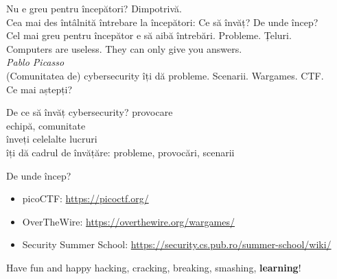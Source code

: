 \documentclass{simple}
\begin{document}
\begin{frame}{Nu e greu pentru începători?}
  \centering
  \pause
  \vspace{0.3cm}
  \large{Dimpotrivă.} \\
  \pause
  \vspace{0.3cm}
  \large{Cea mai des întâlnită întrebare la începători: Ce să învăț? De unde încep?} \\
  \pause
  \vspace{0.3cm}
  \large{Cel mai greu pentru începător e să aibă întrebări. Probleme. Țeluri.} \\
  \pause
  \vspace{0.3cm}
  \large{Computers are useless. They can only give you answers.} \\
  \vspace{2mm}
  \hfill \textit{Pablo Picasso} \\
  \pause
  \vspace{0.3cm}
  \large{(Comunitatea de) cybersecurity îți dă probleme. Scenarii. Wargames. CTF.} \\
  \pause
  \vspace{0.3cm}
  \large{Ce mai aștepți?}
\end{frame}

\begin{frame}{De ce să învăț cybersecurity?}
  \centering
  \vspace{0.5cm}
  \Large{provocare} \\
  \vspace{0.5cm}
  \Large{echipă, comunitate} \\
  \vspace{0.5cm}
  \Large{înveți celelalte lucruri} \\
  \pause
  \vspace{0.5cm}
  \Large{îți dă cadrul de învățăre: probleme, provocări, scenarii}
\end{frame}

\begin{frame}{De unde încep?}
  \begin{itemize}
    \item picoCTF: \url{https://picoctf.org/}
    \item OverTheWire: \url{https://overthewire.org/wargames/}
    \item Security Summer School: \url{https://security.cs.pub.ro/summer-school/wiki/}
  \end{itemize}
\end{frame}

\begin{frame}{}
  \centering
  \LARGE
  Have fun and happy hacking, cracking, breaking, smashing, \textbf{learning}!
\end{frame}
\end{document}
